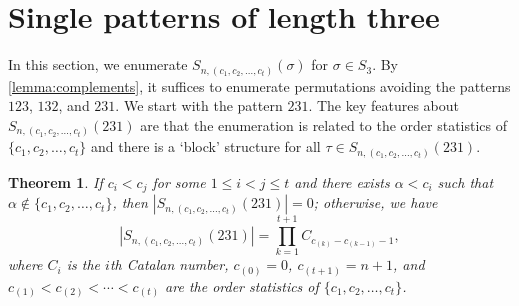 \documentclass[11pt]{article}
\newtheorem{theorem}{Theorem}[section]
\theoremstyle{definition}
\numberwithin{equation}{section}
\begin{document}
\section{Single patterns of length three}\label{Section:Single3}
In this section, we enumerate $S_{n,(c_1,c_2,\ldots,c_t)}(\sigma)$ for $\sigma\in S_3$. By \cref{lemma:complements}, it suffices to enumerate permutations avoiding the patterns $123$, $132$, and $231$. We start with the pattern $231$. The key features about $S_{n,(c_1,c_2,\ldots,c_t)}(231)$ are that the enumeration is related to the order statistics of $\{c_1,c_2,\ldots,c_t\}$ and there is a `block' structure for all $\tau\in S_{n,(c_1,c_2,\ldots,c_t)}(231)$.

\begin{theorem}\label{Theorem:LeadingTerms231}
    If $c_i<c_j$ for some $1\leq i<j\leq t$ and there exists $\alpha<c_i$ such that $\alpha\notin\{c_1,c_2,\ldots,c_t\}$, then $|S_{n,(c_1,c_2,\ldots,c_t)}(231)|=0$; otherwise, we have
\begin{equation}\label{Qformula}
    |S_{n,(c_1,c_2,\ldots,c_t)}(231)|=\prod_{k=1}^{t+1}C_{c_{(k)}-c_{(k-1)}-1},
\end{equation}
    where $C_i$ is the $i$th Catalan number, $c_{(0)}=0$, $c_{(t+1)}=n+1$, and $c_{(1)}<c_{(2)}<\cdots<c_{(t)}$ are the order statistics of $\{c_1,c_2,\ldots,c_t\}$.
\end{theorem}
\end{document}
